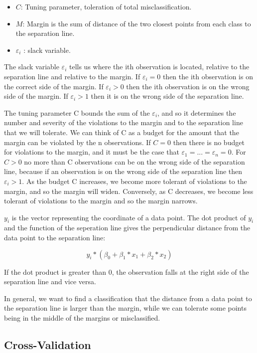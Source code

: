 \documentclass[10pt,letterpaper]{article}
\providecommand{\tightlist}{%
  \setlength{\itemsep}{0pt}\setlength{\parskip}{0pt}}
\begin{document}
\begin{itemize}
\tightlist
\item
  \(C\): Tuning parameter, toleration of total misclassification.
\item
  \(M\): Margin is the sum of distance of the two closest points from
  each class to the separation line.
\item
  \(\varepsilon_i\) : slack variable.
\end{itemize}

The slack variable \(\varepsilon_i\) tells us where the ith observation
is located, relative to the separation line and relative to the margin.
If \(\varepsilon_i = 0\) then the ith observation is on the correct side
of the margin. If \(\varepsilon_i > 0\) then the ith observation is on
the wrong side of the margin. If \(\varepsilon_i > 1\) then it is on the
wrong side of the separation line.

The tuning parameter C bounds the sum of the \(\varepsilon_i\), and so
it determines the number and severity of the violations to the margin
and to the separation line that we will tolerate. We can think of C as a
budget for the amount that the margin can be violated by the n
observations. If \(C = 0\) then there is no budget for violations to the
margin, and it must be the case that
\(\varepsilon_1 = . . . = \varepsilon_n = 0\). For \(C > 0\) no more
than C observations can be on the wrong side of the separation line,
because if an observation is on the wrong side of the separation line
then \(\varepsilon_i > 1\). As the budget C increases, we become more
tolerant of violations to the margin, and so the margin will widen.
Conversely, as C decreases, we become less tolerant of violations to the
margin and so the margin narrows.

\(y_i\) is the vector representing the coordinate of a data point. The
dot product of \(y_i\) and the function of the seperation line gives the
perpendicular distance from the data point to the separation line:

\[y_i * ( \beta_0 + \beta_1 * x_1 + \beta_2 * x_2 )\]

If the dot product is greater than 0, the observation falls at the right
side of the separation line and vice versa.

In general, we want to find a classification that the distance from a
data point to the separation line is larger than the margin, while we
can tolerate some points being in the middle of the margins or
misclassified.

\subsection{Cross-Validation}\label{cross-validation}
\end{document}
